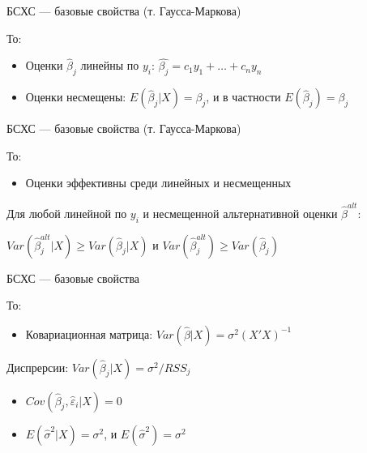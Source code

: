 \documentclass[ignorenonframetext,]{beamer}
\begin{document}
\begin{frame}{БСХС --- базовые свойства (т. Гаусса-Маркова)}

То:

\begin{itemize}
\item
  Оценки \(\hat{\beta}_j\) линейны по \(y_i\):
  \(\hat{\beta_j}=c_1 y_1 + \ldots + c_n y_n\)
\item
  Оценки несмещены: \(E(\hat{\beta}_j |X )=\beta_j\), и в частности
  \(E(\hat{\beta}_j)=\beta_j\)
\end{itemize}

\end{frame}

\begin{frame}{БСХС --- базовые свойства (т. Гаусса-Маркова)}

То:

\begin{itemize}
\itemsep1pt\parskip0pt
\item
  Оценки эффективны среди линейных и несмещенных
\end{itemize}

Для любой линейной по \(y_i\) и несмещенной альтернативной оценки
\(\hat{\beta}^{alt}\):

\(Var(\hat{\beta}_j^{alt} | X)\geq Var(\hat{\beta}_j | X)\) и
\(Var(\hat{\beta}_j^{alt} )\geq Var(\hat{\beta}_j )\)

\end{frame}

\begin{frame}{БСХС --- базовые свойства}

То:

\begin{itemize}
\itemsep1pt\parskip0pt
\item
  Ковариационная матрица: \(Var(\hat{\beta} | X )=\sigma^2 (X'X)^{-1}\)
\end{itemize}

Диспрерсии: \(Var(\hat{\beta}_j| X)=\sigma^2/RSS_j\)

\begin{itemize}
\itemsep1pt\parskip0pt
\item
  \(Cov(\hat{\beta}_j,\hat{\varepsilon}_i | X)=0\)
\item
  \(E(\hat{\sigma}^2 |X ) = \sigma^2\), и
  \(E(\hat{\sigma}^2 ) = \sigma^2\)
\end{itemize}

\end{frame}
\end{document}
